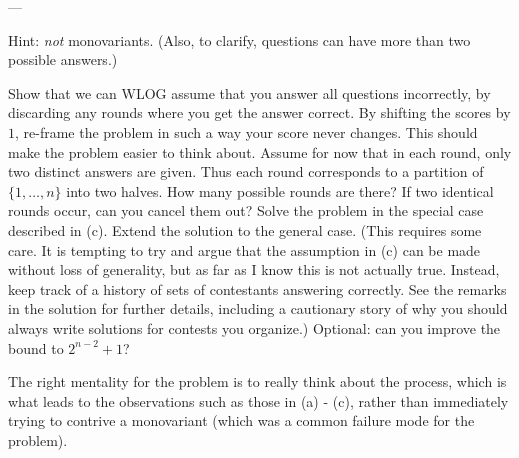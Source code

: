 ---

Hint: \emph{not} monovariants.
(Also, to clarify, questions can have more than
two possible answers.)
\begin{walk}
  \ii Show that we can WLOG assume that you answer all questions incorrectly,
  by discarding any rounds where you get the answer correct.
  \ii By shifting the scores by $1$,
  re-frame the problem in such a way your score never changes.
  This should make the problem easier to think about.
  \ii Assume for now that in each round, only two distinct answers are given.
  Thus each round corresponds to a partition of $\{1, \dots, n\}$ into two halves.
  How many possible rounds are there?
  If two identical rounds occur, can you cancel them out?
  \ii Solve the problem in the special case described in (c).
  \ii Extend the solution to the general case.
  (This requires some care.  It is tempting to try and argue
  that the assumption in (c) can be made without loss of generality,
  but as far as I know this is not actually true.
  Instead, keep track of a history of sets of contestants answering correctly.
  See the remarks in the solution for further details, including a cautionary story
  of why you should always write solutions for contests you organize.)
  \ii Optional: can you improve the bound to $2^{n-2}+1$?
\end{walk}
The right mentality for the problem is to really think about the process,
which is what leads to the observations such as those in (a) - (c),
rather than immediately trying to contrive a monovariant
(which was a common failure mode for the problem).
